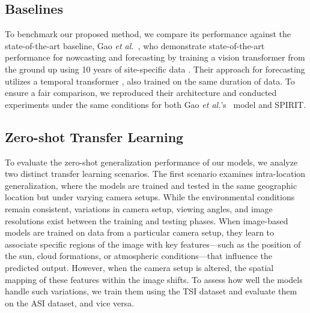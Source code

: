 \subsection{Baselines}
To benchmark our proposed method, we compare its performance against the state-of-the-art baseline, Gao \emph{et al.}~\cite{wacv2022}, who demonstrate state-of-the-art performance for nowcasting and forecasting by training a vision transformer \cite{google_vit} from the ground up using 10 years of site-specific data \cite{tsi_dataset, wacv2022, talha2019}. Their approach for forecasting utilizes a temporal transformer \cite{vaswani2017attention}, also trained on the same duration of data. To ensure a fair comparison, we reproduced their architecture and conducted experiments under the same conditions for both Gao \emph{et al.}'s~\cite{wacv2022} model and SPIRIT.




\subsection{Zero-shot Transfer Learning}
\label{subsec:zero_shot_transfer_learning}
To evaluate the zero-shot generalization performance of our models, we analyze two distinct transfer learning scenarios. The first scenario examines intra-location generalization, where the models are trained and tested in the same geographic location but under varying camera setups. While the environmental conditions remain consistent, variations in camera setup, viewing angles, and image resolutions exist between the training and testing phases. When image-based models are trained on data from a particular camera setup, they learn to associate specific regions of the image with key features—such as the position of the sun, cloud formations, or atmospheric conditions—that influence the predicted output. However, when the camera setup is altered, the spatial mapping of these features within the image shifts. To assess how well the models handle such variations, we train them using the TSI dataset and evaluate them on the ASI dataset, and vice versa. 

